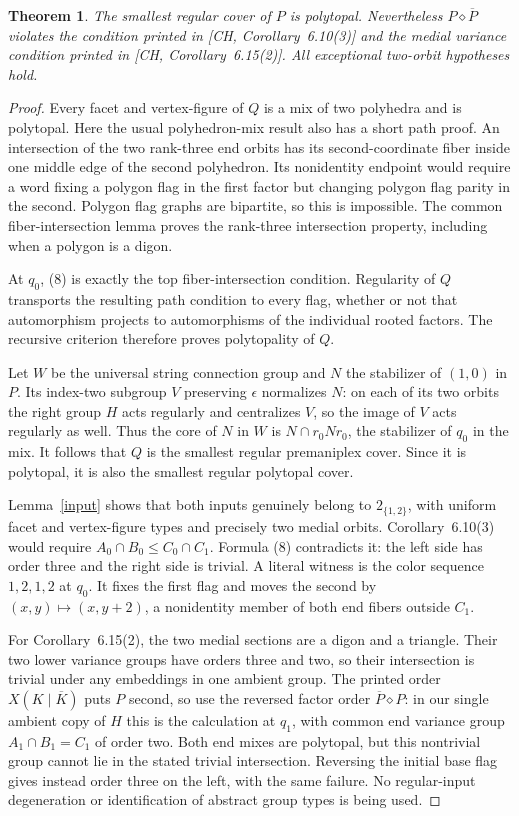 \documentclass[a4paper,11pt]{article}
\newcommand{\mix}{\mathbin{\diamond}}\newcommand{\Aut}{\operatorname{Aut}}
\newtheorem{theorem}{Theorem}\newtheorem{lemma}[theorem]{Lemma}
\begin{document}
\begin{theorem}\label{counterexample}
The smallest regular cover of $P$ is polytopal. Nevertheless
$P\mix\overline P$ violates the condition printed in
[CH, Corollary~6.10(3)] and the medial variance condition printed in
[CH, Corollary~6.15(2)]. All exceptional two-orbit hypotheses hold.
\end{theorem}
\begin{proof}
Every facet and vertex-figure of $Q$ is a mix of two polyhedra and is
polytopal. Here the usual polyhedron-mix result also has a short path
proof. An intersection of the two rank-three end orbits has its
second-coordinate fiber inside one middle edge of the second
polyhedron. Its nonidentity endpoint would require a word fixing a
polygon flag in the first factor but changing polygon flag parity
in the second. Polygon flag graphs are bipartite, so this is
impossible. The common fiber-intersection lemma proves the rank-three
intersection property, including when a polygon is a digon.

At $q_0$, (8) is exactly the top fiber-intersection condition.
Regularity of $Q$ transports the resulting path condition to every
flag, whether or not that automorphism projects to automorphisms of
the individual rooted factors. The recursive criterion therefore
proves polytopality of $Q$.

Let $W$ be the universal string connection group and $N$ the stabilizer
of $(1,0)$ in $P$. Its index-two subgroup $V$ preserving $\epsilon$
normalizes $N$: on each of its two orbits the right group $H$ acts
regularly and centralizes $V$, so the image of $V$ acts regularly as well.
Thus the core of $N$ in $W$ is $N\cap r_0Nr_0$, the stabilizer of
$q_0$ in the mix. It follows that $Q$ is the smallest regular
premaniplex cover. Since it is polytopal, it is also the smallest
regular polytopal cover.

Lemma~\ref{input} shows that both inputs genuinely belong to
$2_{\{1,2\}}$, with uniform facet and vertex-figure types and precisely
two medial orbits. Corollary~6.10(3) would require
$A_0\cap B_0\leq C_0\cap C_1$. Formula (8) contradicts it:
the left side has order three and the right side is trivial.
A literal witness is the color sequence $1,2,1,2$ at $q_0$.
It fixes the first flag and moves the second by
$(x,y)\mapsto(x,y+2)$, a nonidentity member of both end fibers outside
$C_1$.

For Corollary~6.15(2), the two medial sections are a digon and a
triangle. Their two lower variance groups have orders three and two,
so their intersection is trivial under any embeddings in one ambient
group. The printed order $X(K\mid\overline K)$ puts $P$ second,
so use the reversed factor order $\overline P\mix P$: in our single
ambient copy of $H$ this is the calculation at $q_1$, with common
end variance group $A_1\cap B_1=C_1$ of order two. Both end mixes
are polytopal, but this nontrivial group cannot lie in the stated
trivial intersection. Reversing the initial base flag gives instead
order three on the left, with the same failure. No regular-input
degeneration or identification of abstract group types is being used.
\end{proof}
\end{document}
